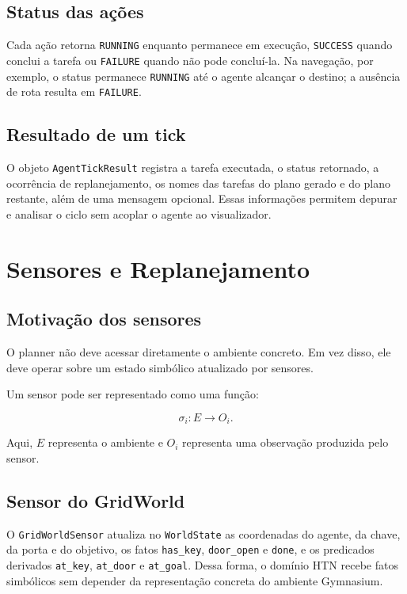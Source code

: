 \section{Status das ações}

Cada ação retorna \texttt{RUNNING} enquanto permanece em execução,
\texttt{SUCCESS} quando conclui a tarefa ou \texttt{FAILURE} quando não pode
concluí-la. Na navegação, por exemplo, o status permanece \texttt{RUNNING} até
o agente alcançar o destino; a ausência de rota resulta em \texttt{FAILURE}.

\section{Resultado de um tick}

O objeto \texttt{AgentTickResult} registra a tarefa executada, o status
retornado, a ocorrência de replanejamento, os nomes das tarefas do plano
gerado e do plano restante, além de uma mensagem opcional. Essas informações
permitem depurar e analisar o ciclo sem acoplar o agente ao visualizador.

\chapter{Sensores e Replanejamento}

\section{Motivação dos sensores}

O planner não deve acessar diretamente o ambiente concreto.
Em vez disso, ele deve operar sobre um estado simbólico atualizado por sensores.

Um sensor pode ser representado como uma função:

\begin{equation}
\sigma_i:E \rightarrow O_i.
\end{equation}

Aqui, $E$ representa o ambiente e $O_i$ representa uma observação produzida
pelo sensor.

\section{Sensor do GridWorld}

O \texttt{GridWorldSensor} atualiza no \texttt{WorldState} as coordenadas do
agente, da chave, da porta e do objetivo, os fatos \texttt{has\_key},
\texttt{door\_open} e \texttt{done}, e os predicados derivados
\texttt{at\_key}, \texttt{at\_door} e \texttt{at\_goal}. Dessa forma, o
domínio HTN recebe fatos simbólicos sem depender da representação concreta do
ambiente Gymnasium.

